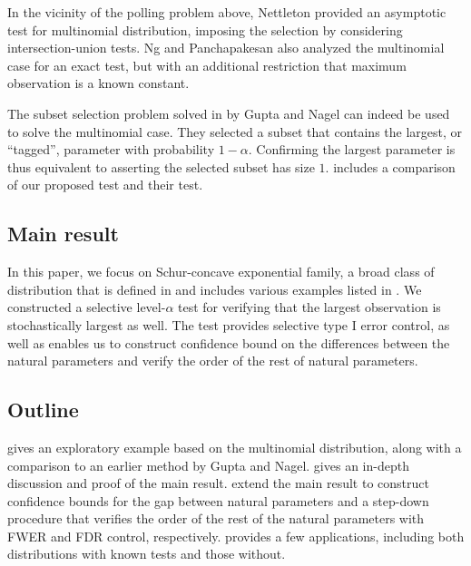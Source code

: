 \documentclass[11pt]{article}
\begin{document}
In the vicinity of the polling problem above, Nettleton \cite{Nettleton:2009ht} provided an asymptotic test for multinomial distribution, imposing the selection by considering intersection-union tests. Ng and Panchapakesan \cite{Ng:2007cn} also analyzed the multinomial case for an exact test, but with an additional restriction that maximum observation is a known constant.

The subset selection problem solved in \cite{Gupta:1967wg} by Gupta and Nagel can indeed be used to solve the multinomial case. They selected a subset that contains the largest, or ``tagged'', parameter with probability $1-\alpha$. Confirming the largest parameter is thus equivalent to asserting the selected subset has size $1$.  includes a comparison of our proposed test and their test.

\subsection{Main result}

In this paper, we focus on Schur-concave exponential family, a broad class of distribution that is defined in  and includes various examples listed in . We constructed a selective level-$\alpha$ test for verifying that the largest observation is stochastically largest as well. The test provides selective type I error control, as well as enables us to construct confidence bound on the differences between the natural parameters and verify the order of the rest of natural parameters.

\subsection{Outline}

 gives an exploratory example based on the multinomial distribution, along with a comparison to an earlier method by Gupta and Nagel.  gives an in-depth discussion and proof of the main result.  extend the main result to construct confidence bounds for the gap between natural parameters and a step-down procedure that verifies the order of the rest of the natural parameters with FWER and FDR control, respectively.  provides a few applications, including both distributions with known tests and those without.
\end{document}
